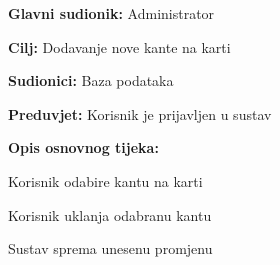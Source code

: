 				
				\noindent {}
					\begin{packed_item}
	
						\item \textbf{Glavni sudionik: }Administrator
						\item  \textbf{Cilj:} Dodavanje nove kante na karti
						\item  \textbf{Sudionici:} Baza podataka
						\item  \textbf{Preduvjet:} Korisnik je prijavljen u sustav
						\item  \textbf{Opis osnovnog tijeka:}
						
						\item[] \begin{packed_enum}
	
							\item Korisnik odabire kantu na karti
							\item Korisnik uklanja odabranu kantu
							\item Sustav sprema unesenu promjenu	
						\end{packed_enum}
						
											\end{packed_item}
				
				
				
